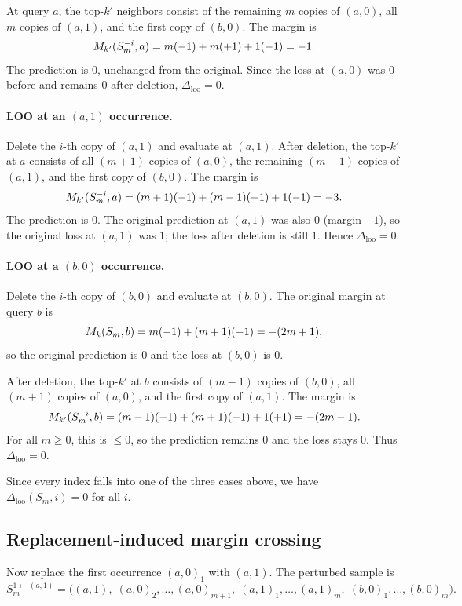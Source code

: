 At query $a$, the top-$k'$ neighbors consist of the remaining $m$ copies of
$(a,0)$, all $m$ copies of $(a,1)$, and the first copy of $(b,0)$.  The margin
is
\[
M_{k'}(S_m^{-i}, a) = m(-1) + m(+1) + 1(-1) = -1.
\]
The prediction is $0$, unchanged from the original.  Since the loss at $(a,0)$
was $0$ before and remains $0$ after deletion, $\Delta_{\mathrm{loo}} = 0$.

\paragraph{LOO at an $(a,1)$ occurrence.}
Delete the $i$-th copy of $(a,1)$ and evaluate at $(a,1)$.  After deletion, the
top-$k'$ at $a$ consists of all $(m+1)$ copies of $(a,0)$, the remaining
$(m-1)$ copies of $(a,1)$, and the first copy of $(b,0)$.  The margin is
\[
M_{k'}(S_m^{-i}, a) = (m+1)(-1) + (m-1)(+1) + 1(-1) = -3.
\]
The prediction is $0$.  The original prediction at $(a,1)$ was also $0$ (margin
$-1$), so the original loss at $(a,1)$ was $1$; the loss after deletion is
still $1$.  Hence $\Delta_{\mathrm{loo}} = 0$.

\paragraph{LOO at a $(b,0)$ occurrence.}
Delete the $i$-th copy of $(b,0)$ and evaluate at $(b,0)$.  The original margin
at query $b$ is
\[
M_k(S_m, b) = m(-1) + (m+1)(-1) = -(2m+1),
\]
so the original prediction is $0$ and the loss at $(b,0)$ is $0$.

After deletion, the top-$k'$ at $b$ consists of $(m-1)$ copies of $(b,0)$, all
$(m+1)$ copies of $(a,0)$, and the first copy of $(a,1)$.  The margin is
\[
M_{k'}(S_m^{-i}, b) = (m-1)(-1) + (m+1)(-1) + 1(+1) = -(2m-1).
\]
For all $m \ge 0$, this is $\le 0$, so the prediction remains $0$ and the loss
stays $0$.  Thus $\Delta_{\mathrm{loo}} = 0$.

Since every index falls into one of the three cases above, we have
$\Delta_{\mathrm{loo}}(S_m, i) = 0$ for all $i$.

\subsection{Replacement-induced margin crossing}

Now replace the first occurrence $(a,0)_1$ with $(a,1)$.  The perturbed sample
is
\[
S_m^{1 \leftarrow (a,1)}
= \big((a,1),\; (a,0)_2,\ldots,(a,0)_{m+1},\;
        (a,1)_1,\ldots,(a,1)_m,\;
        (b,0)_1,\ldots,(b,0)_m\big).
\]

